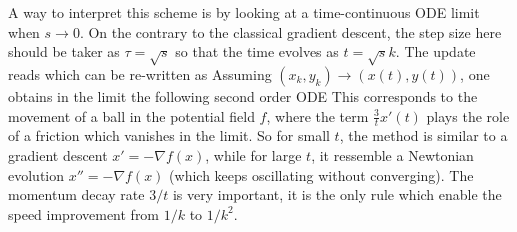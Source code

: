 A way to interpret this scheme is by looking at a time-continuous ODE limit when $s \rightarrow 0$. On the contrary to the classical gradient descent, the step size here should be taker as $\tau=\sqrt{s}$ so that the time evolves as $t=\sqrt{s} k$. 
% 
The update reads
which can be re-written as
Assuming $(x_k,y_k) \rightarrow (x(t), y(t))$, one obtains in the limit the following second order ODE
This corresponds to the movement of a ball in the potential field $f$, where the term $\frac{3}{t} x'(t)$ plays the role of a friction which vanishes in the limit.
%
So for small $t$, the method is similar to a gradient descent $x'=-\nabla f(x)$, while for large $t$, it ressemble a Newtonian evolution $x''=-\nabla f(x)$ (which keeps oscillating without converging). 
%
The momentum decay rate $3/t$ is very important, it is the only rule which enable the speed improvement from $1/k$ to $1/k^2$.